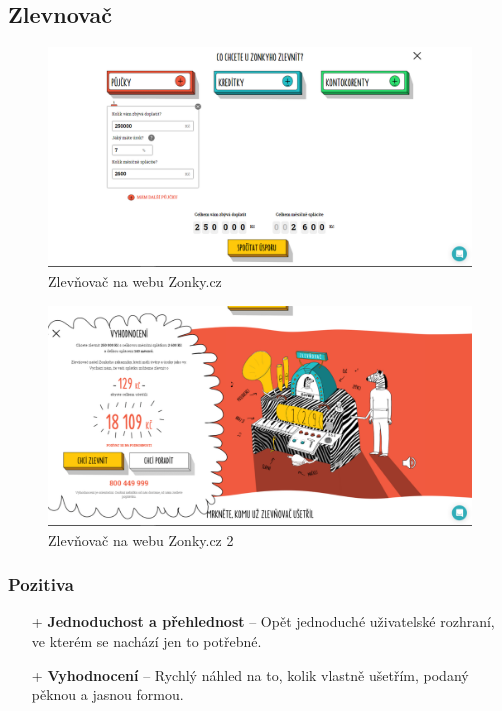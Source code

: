 \newpage
\subsection{Zlevnovač}
\begin{figure}[h]
    \centering
    \includegraphics[width=1.0\textwidth]{media/zonky/zlevnovac.png}
    \caption{Zlevňovač na webu Zonky.cz}
    \label{fig:zonky:zlevnovac}
\end{figure}
\begin{figure}[h]
    \centering
    \includegraphics[width=1.0\textwidth]{media/zonky/zlevnovac2.png}
    \caption{Zlevňovač na webu Zonky.cz 2}
    \label{fig:zonky:zlevnovac2}
\end{figure}
\subsubsection*{Pozitiva}
\begin{itemize}
    \item[+] \textbf{Jednoduchost a přehlednost} -- Opět jednoduché uživatelské rozhraní, ve kterém se nachází jen to potřebné.
    \item[+] \textbf{Vyhodnocení} -- Rychlý náhled na to, kolik vlastně ušetřím, podaný pěknou a jasnou formou.
\end{itemize}
